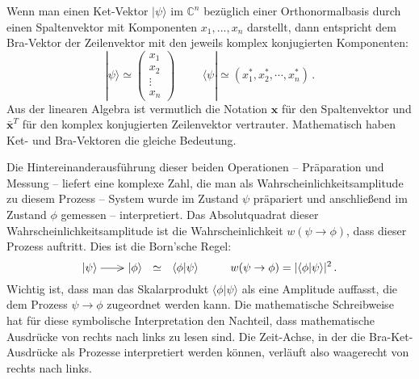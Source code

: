 Wenn man einen Ket-Vektor $|\psi\rangle$  im $\mathbb{C}^n$ bez\"uglich einer Orthonormalbasis
durch einen Spaltenvektor mit Komponenten $x_1, ..., x_n$ darstellt, 
dann entspricht dem Bra-Vektor der Zeilenvektor mit den jeweils komplex konjugierten Komponenten:
\begin{equation}
\label{eq_BK_Komponenten}
          |\psi\rangle \simeq \left( \begin{array}{c} x_1 \\ x_2 \\ \vdots \\ x_n \end{array} \right)
          \hspace{1cm} \langle \psi | \simeq (x_1^* , x_2^*, \cdots , x_n^* ) \, .
\end{equation}
Aus der linearen Algebra ist vermutlich die Notation $\pmb{x}$ f\"ur den Spaltenvektor und
$\pmb{\bar{x}}^T$ f\"ur den komplex konjugierten Zeilenvektor vertrauter. Mathematisch haben 
Ket- und Bra-Vektoren die gleiche Bedeutung. 

Die Hintereinanderausf\"uhrung dieser beiden Operationen -- Pr\"aparation und Messung -- 
liefert eine komplexe Zahl, die man als Wahrscheinlichkeitsamplitude zu
diesem Prozess -- System wurde im Zustand $\psi$ pr\"apariert und anschlie\ss end im
Zustand $\phi$ gemessen -- interpretiert. Das Absolutquadrat dieser Wahrscheinlichkeitsamplitude
ist die Wahrscheinlichkeit $w(\psi \rightarrow \phi)$, dass dieser Prozess auftritt. Dies ist
die Born'sche Regel:
\begin{equation}
       | \psi \rangle  \begin{picture}(14,0)(0,0) \put(3,2.4){\line(1,0){20}} \end{picture} > | \phi \rangle
        ~~ \simeq  ~~  \langle \phi | \psi \rangle  \hspace{1cm}
         w(\psi \rightarrow \phi) = | \langle \phi | \psi \rangle |^2  \, .
\end{equation}                    
Wichtig ist, dass man das Skalarprodukt $\langle \phi | \psi \rangle$ als eine Amplitude auffasst,
die dem Prozess $\psi \rightarrow \phi$ zugeordnet werden kann. Die mathematische Schreibweise hat
f\"ur diese symbolische Interpretation
den Nachteil, dass mathematische Ausdr\"ucke von rechts nach
links zu lesen sind. Die \glqq Zeit\grqq-Achse, in der die Bra-Ket-Ausdr\"ucke als Prozesse 
interpretiert werden k\"onnen, verl\"auft also waagerecht von rechts nach links.

